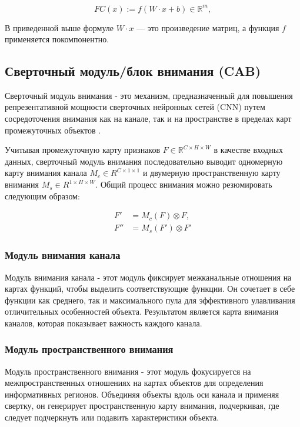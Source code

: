 \begin{equation}
    FC(x) := f(W \cdot x + b) \in \mathbb{R}^{m}
, \end{equation}

В приведенной выше формуле \(W \cdot x\) — это произведение матриц, а функция \(f\) применяется покомпонентно.

\subsection*{Сверточный модуль/блок внимания (CAB)}

Сверточный модуль внимания - это механизм, предназначенный для повышения репрезентативной мощности сверточных нейронных сетей (CNN) путем сосредоточения внимания как на канале, так и на пространстве в пределах карт промежуточных объектов \cite{woo2018cbam}.

Учитывая промежуточную карту признаков \(F \in \mathbb{R}^{C \times H \times W}\) в качестве входных данных, сверточный модуль внимания последовательно выводит одномерную карту внимания канала \({M}_{c} \in {R}^{C \times 1 \times 1} \) и двумерную пространственную карту внимания \( {M}_{s} \in {R}^{1 \times H \times W} \). Общий процесс внимания можно резюмировать следующим образом:

\begin{equation}
\begin{split}
	F' & = {M}_{c}(F) \otimes F, \\
	F'' & = {M}_{s}(F') \otimes F'
\end{split}
\end{equation}

\subsubsection*{Модуль внимания канала}

Модуль внимания канала - этот модуль фиксирует межканальные отношения на картах функций, чтобы выделить соответствующие функции. Он сочетает в себе функции как среднего, так и максимального пула для эффективного улавливания отличительных особенностей объекта. Результатом является карта внимания каналов, которая показывает важность каждого канала.

\subsubsection*{Модуль пространственного внимания}

Модуль пространственного внимания - этот модуль фокусируется на межпространственных отношениях на картах объектов для определения информативных регионов. Объединяя объекты вдоль оси канала и применяя свертку, он генерирует пространственную карту внимания, подчеркивая, где следует подчеркнуть или подавить характеристики объекта.

